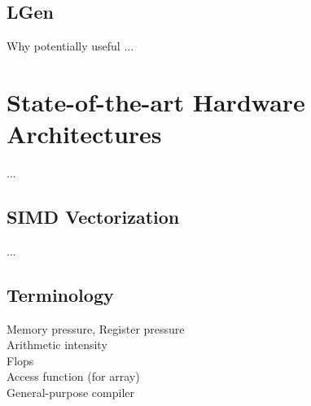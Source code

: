 \subsection{LGen}
Why potentially useful ...


\section{State-of-the-art Hardware Architectures}
\label{sec:bkg:arch}
...

\subsection{SIMD Vectorization}
...

\subsection{Terminology}
\label{sec:bkg:terminology}

\begin{description}
\item[Memory pressure, Register pressure]
\item[Arithmetic intensity]
\item[Flops]
\item[Access function (for array)]
\item[General-purpose compiler]
\end{description}
